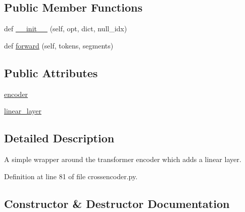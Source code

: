 \subsection*{Public Member Functions}
\begin{DoxyCompactItemize}
\item 
def \hyperlink{classparlai_1_1agents_1_1transformer_1_1crossencoder_1_1CrossEncoderModule_ad002e8a3432930432430e2b4c435cc3e}{\+\_\+\+\_\+init\+\_\+\+\_\+} (self, opt, dict, null\+\_\+idx)
\item 
def \hyperlink{classparlai_1_1agents_1_1transformer_1_1crossencoder_1_1CrossEncoderModule_a86a9cf18bddebb5a1ee9c4096cfe7c20}{forward} (self, tokens, segments)
\end{DoxyCompactItemize}
\subsection*{Public Attributes}
\begin{DoxyCompactItemize}
\item 
\hyperlink{classparlai_1_1agents_1_1transformer_1_1crossencoder_1_1CrossEncoderModule_a7b3493099f48331b36c465cc393b5145}{encoder}
\item 
\hyperlink{classparlai_1_1agents_1_1transformer_1_1crossencoder_1_1CrossEncoderModule_a50568203fcea07cca868109b95dc8dfc}{linear\+\_\+layer}
\end{DoxyCompactItemize}


\subsection{Detailed Description}
\begin{DoxyVerb}A simple wrapper around the transformer encoder which adds a linear
    layer.
\end{DoxyVerb}
 

Definition at line 81 of file crossencoder.\+py.



\subsection{Constructor \& Destructor Documentation}
\mbox{\label{classparlai_1_1agents_1_1transformer_1_1crossencoder_1_1CrossEncoderModule_ad002e8a3432930432430e2b4c435cc3e}} 
